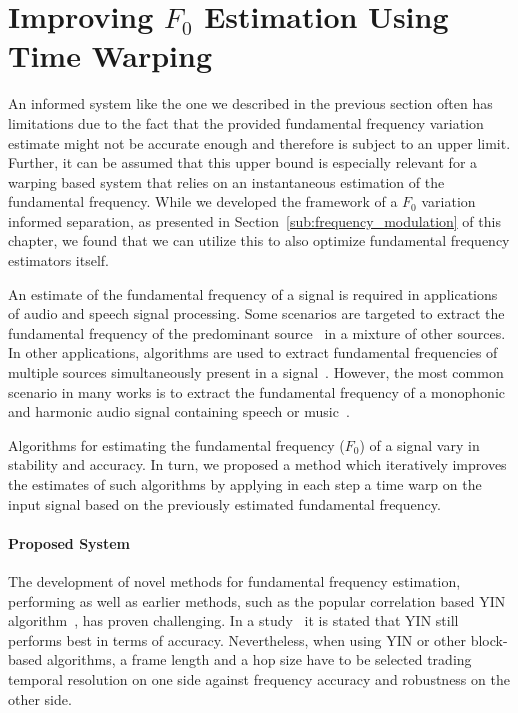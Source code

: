 \section{Improving $F_0$ Estimation Using Time Warping} %
\label{sec:f0method}




An informed system like the one we described in the previous section often has limitations due to the fact that the provided fundamental frequency variation estimate might not be accurate enough and therefore is subject to an upper limit.
Further, it can be assumed that this upper bound is especially relevant for a warping based system that relies on an instantaneous estimation of the fundamental frequency.
While we developed the framework of a $F_0$ variation informed separation, as presented in Section~\ref{sub:frequency_modulation} of this chapter, we found that we can utilize this to also optimize fundamental frequency estimators itself.
\par
An estimate of the fundamental frequency of a signal is required in applications of audio and speech signal processing.
Some scenarios are targeted to extract the fundamental frequency of the predominant source~\cite{salamon12} in a mixture of other sources.
In other applications, algorithms are used to extract fundamental frequencies of multiple sources simultaneously present in a signal~\cite{klapuri03}.
However, the most common scenario in many works is to extract the fundamental frequency of a monophonic and harmonic audio signal containing speech or music~\cite{talkin95, boersma02, decheveigne02, resch07, tidhar10, christensen07}.
\par
Algorithms for estimating the fundamental frequency ($F_0$) of a signal vary in stability and accuracy.
In turn, we proposed a method which iteratively improves the estimates of such algorithms by applying in each step a time warp on the input signal based on the previously estimated fundamental frequency.

\paragraph{Proposed System}
%
The development of novel methods for fundamental frequency estimation, performing as well as earlier methods, such as the popular correlation based \textsc{YIN} algorithm~\cite{decheveigne02}, has proven challenging.
In a study~\cite{babacan13} it is stated that YIN still performs best in terms of accuracy.
Nevertheless, when using YIN or other block-based algorithms, a frame length and a hop size have to be selected trading temporal resolution on one side against frequency accuracy and robustness on the other side.


